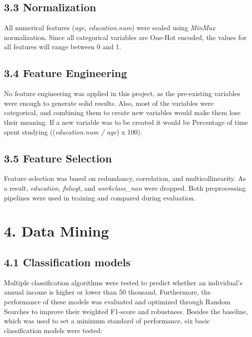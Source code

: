 \documentclass[a4paper,oneside,bibliography=totoc]{scrbook}
\begin{document}
\subsection*{3.3 Normalization}
All numerical features (\textit{age}, \textit{education.num}) were scaled using \textit{MinMax} normalization. Since all categorical variables are One-Hot encoded, the values for all features will range between 0 and 1.

\subsection*{3.4 Feature Engineering}
No feature engineering was applied in this project, as the pre-existing variables were enough to generate solid results. Also, most of the variables were categorical, and combining them to create new variables would make them lose their meaning. If a new variable was to be created it would be Percentage of time spent studying ((\textit{education.num / age}) x 100).

\subsection*{3.5 Feature Selection}
Feature selection was based on redundancy, correlation, and multicollinearity. As a result, \textit{education}, \textit{fnlwgt}, and \textit{workclass\_nan} were dropped. Both preprocessing pipelines were used in training and compared during evaluation. 



\section*{4. Data Mining}
\subsection*{4.1 Classification models}

Multiple classification algorithms were tested to predict whether an individual’s annual income is higher or lower than 50 thousand. Furthermore, the performance of these models was evaluated and optimized through Random Searches to improve their weighted F1-score and robustness. 
Besides the baseline, which was used to set a minimum standard of performance, six basic classification models were tested:
\end{document}
